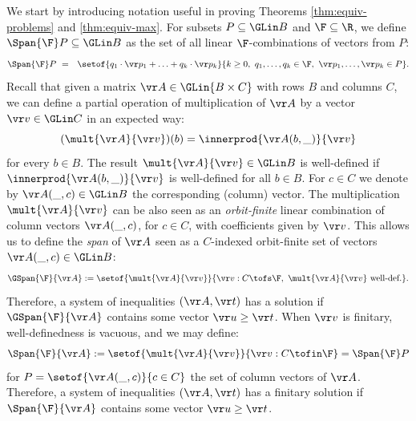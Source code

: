 We start by introducing notation 
useful in proving Theorems \ref{thm:equiv-problems} and \ref{thm:equiv-max}.
For subsets $P\subseteq \GLin B$ and $\F\subseteq \R$, we define $\Span {\F} P\subseteq \GLin B$ as the set of 
all linear $\F$-combinations of vectors from $P$:
\begin{align*} %
\begin{aligned}
 \Span {\F} P \ = \ \  \setof{q_1 \cdot \vr p_1 + \ldots + q_k \cdot \vr p_k}{k\geq 0,
\ q_1,\ldots,q_k\in \F, \ \vr p_1, \ldots, \vr p_k\in P}.
\end{aligned}
\end{align*}
%
Recall that given a matrix $\vr A \in \GLin {B\times C}$ with rows $B$ and columns $C$, we can define a partial operation of 
multiplication of $\vr A$ by a vector $\vr v\in\GLin C$ in an expected way:
\[
(\mult {\vr A}{\vr v})(b) = \innerprod {\vr A(b, \_)} {\vr v}
\]
for every $b\in B$.
The result $\mult {\vr A} {\vr v} \in \GLin B$ is well-defined if $\innerprod {\vr A(b, \_)}{\vr v}$ is well-defined for all $b\in B$.
For $c\in C$ we denote by $\vr A(\_, c) \in \GLin B$ the corresponding (column) vector.
The multiplication $\mult {\vr A}{\vr v}$ can be also seen as an \emph{orbit-finite} linear combination of 
column vectors $\vr A(\_, c)$, for $c\in C$, with coefficients given by $\vr v$. 
This allows us to define the \emph{span} of $\vr A$ seen as a $C$-indexed orbit-finite set of 
vectors $\vr A(\_, c) \in \GLin B$:
%
\begin{align*} %
\GSpan {\F} {\vr A}  :=  \setof{\mult{\vr A}{\vr v}}{\vr v : C\tofs \F, \ \mult{\vr A}{\vr v} \text{ well-def.}}.
\end{align*}
%
Therefore, a system of inequalities $(\vr A, \vr t)$ has a solution if 
$\GSpan {\F} {\vr A}$ contains some vector $\vr u \geq \vr t$.
When $\vr v$ is finitary, well-definedness is vacuous, and we may define:
\[
\Span {\F} {\vr A}  :=  \setof{\mult{\vr A}{\vr v}}{\vr v : C\tofin \F}  =  \Span {\F} P
\]
for $P = \setof{\vr A(\_, c)}{c\in C}$ the set of column vectors of $\vr A$.
Therefore, a system of inequalities $(\vr A, \vr t)$ has a finitary solution if 
$\Span {\F} {\vr A}$ contains some vector $\vr u \geq \vr t$.


